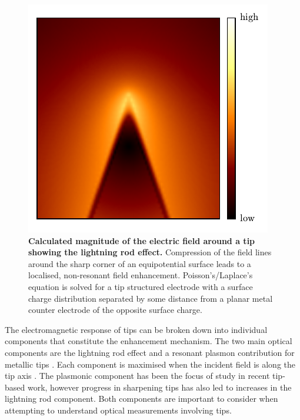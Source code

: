 \documentclass{article}
\begin{document}
\begin{figure}
\centering
\vspace{-15pt}
\includegraphics[width=\textwidth]{figures/lightning_rod_effect}
\vspace{-25pt}
\caption[Calculated magnitude of the electric field around a tip showing the lightning rod effect]{\textbf{Calculated magnitude of the electric field around a tip showing the lightning rod effect.} Compression of the field lines around the sharp corner of an equipotential surface leads to a localised, non-resonant field enhancement. Poisson's/Laplace's equation is solved for a tip structured electrode with a surface charge distribution separated by some distance from a planar metal counter electrode of the opposite surface charge.}
\label{fig:lightning_rod_effect}
\end{figure}

The electromagnetic response of tips can be broken down into individual components that constitute the enhancement mechanism. The two main optical components are the lightning rod effect and a resonant plasmon contribution for metallic tips \cite{esteban2006, zhang2009, schmid2013}. Each component is maximised when the incident field is along the tip axis \cite{zhang2014}. The plasmonic component has been the focus of study in recent tip-based work, however progress in sharpening tips has also led to increases in the lightning rod component. Both components are important to consider when attempting to understand optical measurements involving tips.
\end{document}
